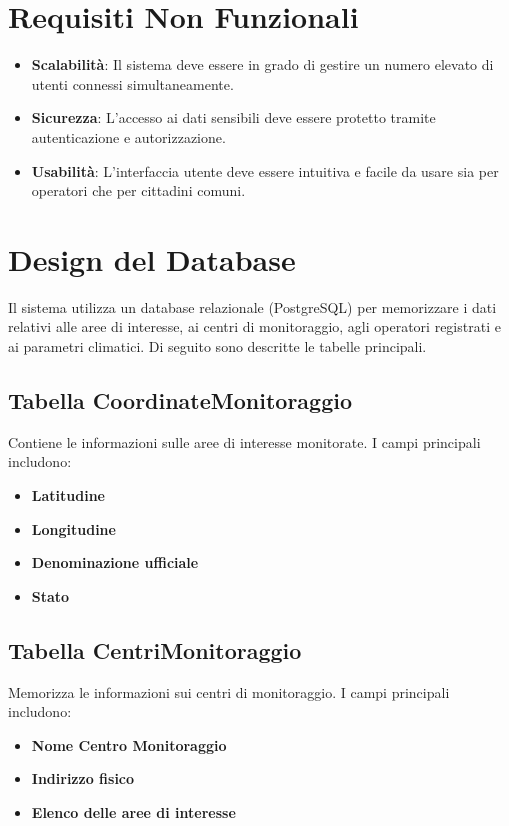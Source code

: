 \documentclass[a4paper,12pt]{article}
\begin{document}
\section{Requisiti Non Funzionali}
\begin{itemize}
    \item \textbf{Scalabilità}: Il sistema deve essere in grado di gestire un numero elevato di utenti connessi simultaneamente.
    \item \textbf{Sicurezza}: L'accesso ai dati sensibili deve essere protetto tramite autenticazione e autorizzazione.
    \item \textbf{Usabilità}: L'interfaccia utente deve essere intuitiva e facile da usare sia per operatori che per cittadini comuni.
\end{itemize}

\section{Design del Database}
Il sistema utilizza un database relazionale (PostgreSQL) per memorizzare i dati relativi alle aree di interesse, ai centri di monitoraggio, agli operatori registrati e ai parametri climatici. Di seguito sono descritte le tabelle principali.

\subsection{Tabella CoordinateMonitoraggio}
Contiene le informazioni sulle aree di interesse monitorate. I campi principali includono:
\begin{itemize}
    \item \textbf{Latitudine}
    \item \textbf{Longitudine}
    \item \textbf{Denominazione ufficiale}
    \item \textbf{Stato}
\end{itemize}

\subsection{Tabella CentriMonitoraggio}
Memorizza le informazioni sui centri di monitoraggio. I campi principali includono:
\begin{itemize}
    \item \textbf{Nome Centro Monitoraggio}
    \item \textbf{Indirizzo fisico}
    \item \textbf{Elenco delle aree di interesse}
\end{itemize}
\end{document}
